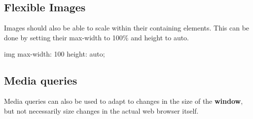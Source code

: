 \documentclass{report}
\begin{document}
    \bigbreak \noindent 
    \subsection{Flexible Images}
    \bigbreak \noindent 
    Images should also be able to scale within their containing elements. This can be done by setting their max-width to 100\% and height to auto.
    \bigbreak \noindent 
    \begin{csscode}
    img {
        max-width: 100%
        height: auto;
    }
    \end{csscode}

    \bigbreak \noindent 
    \subsection{Media queries}
    \bigbreak \noindent 
    Media queries can also be used to adapt to changes in the size of the \textbf{window}, but not necessarily size changes in the actual web browser itself.







    
    










    



























    
\end{document}
